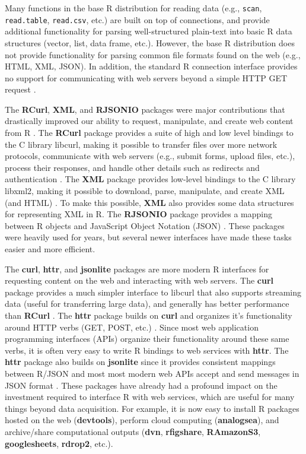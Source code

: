 \documentclass[11pt]{isuthesis}
\begin{document}
Many functions in the base R distribution for reading data (e.g.,
\texttt{scan}, \texttt{read.table}, \texttt{read.csv}, etc.) are built
on top of connections, and provide additional functionality for parsing
well-structured plain-text into basic R data structures (vector, list,
data frame, etc.). However, the base R distribution does not provide
functionality for parsing common file formats found on the web (e.g.,
HTML, XML, JSON). In addition, the standard R connection interface
provides no support for communicating with web servers beyond a simple
HTTP GET request \citep{Lang:2006us}.

The \textbf{RCurl}, \textbf{XML}, and \textbf{RJSONIO} packages were
major contributions that drastically improved our ability to request,
manipulate, and create web content from R \citep{nolan-lang}. The
\textbf{RCurl} package provides a suite of high and low level bindings
to the C library libcurl, making it possible to transfer files over more
network protocols, communicate with web servers (e.g., submit forms,
upload files, etc.), process their responses, and handle other details
such as redirects and authentication \citep{RCurl}. The \textbf{XML}
package provides low-level bindings to the C library libxml2, making it
possible to download, parse, manipulate, and create XML (and HTML)
\citep{XML}. To make this possible, \textbf{XML} also provides some data
structures for representing XML in R. The \textbf{RJSONIO} package
provides a mapping between R objects and JavaScript Object Notation
(JSON) \citep{RJSONIO}. These packages were heavily used for years, but
several newer interfaces have made these tasks easier and more
efficient.

The \textbf{curl}, \textbf{httr}, and \textbf{jsonlite} packages are
more modern R interfaces for requesting content on the web and
interacting with web servers. The \textbf{curl} package provides a much
simpler interface to libcurl that also supports streaming data (useful
for transferring large data), and generally has better performance than
\textbf{RCurl} \citep{curl}. The \textbf{httr} package builds on
\textbf{curl} and organizes it's functionality around HTTP verbs (GET,
POST, etc.) \citep{httr}. Since most web application programming
interfaces (APIs) organize their functionality around these same verbs,
it is often very easy to write R bindings to web services with
\textbf{httr}. The \textbf{httr} package also builds on
\textbf{jsonlite} since it provides consistent mappings between R/JSON
and most most modern web APIs accept and send messages in JSON format
\citep{jsonlite}. These packages have already had a profound impact on
the investment required to interface R with web services, which are
useful for many things beyond data acquisition. For example, it is now
easy to install R packages hosted on the web (\textbf{devtools}),
perform cloud computing (\textbf{analogsea}), and archive/share
computational outputs (\textbf{dvn}, \textbf{rfigshare},
\textbf{RAmazonS3}, \textbf{googlesheets}, \textbf{rdrop2}, etc.).
\end{document}
